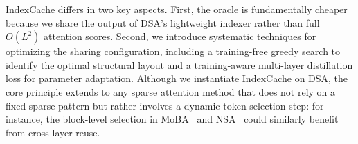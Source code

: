 IndexCache differs in two key aspects.
First, the oracle is fundamentally cheaper because we share the output of DSA's lightweight indexer rather than full~$O(L^2)$ attention scores.
Second, we introduce systematic techniques for optimizing the sharing configuration, including a training-free greedy search to identify the optimal structural layout and a training-aware multi-layer distillation loss for parameter adaptation.
Although we instantiate IndexCache on DSA, the core principle extends to any sparse attention method that does not rely on a fixed sparse pattern but rather involves a dynamic token selection step: for instance, the block-level selection in MoBA~\citep{moba} and NSA~\citep{nsa} could similarly benefit from cross-layer reuse.